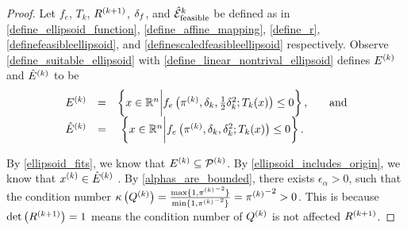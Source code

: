 \begin{proof}
Let 
$f_e$,
$T_k$,
${R^{(k+1)}}$, $\delta_{f}$, and ${{\mathcal {\hat E}_{\text{feasible}}}^k}$
be defined as in
\cref{define_ellipsoid_function},
\cref{define_affine_mapping},
\cref{define_r},
\cref{definefeasibleellipsoid}, and
\cref{definescaledfeasibleellipsoid}
respectively. 
Observe \cref{define_suitable_ellipsoid} with \cref{define_linear_nontrival_ellipsoid} defines  ${E^{(k)}}$ and ${{\hat E}^{(k)}}$ to be
\begin{align*}
\begin{array}{cccc}
{E^{(k)}} &=& \left\{x \in \mathbb R^n \bigg | f_e\left(\pi^{(k)}, \delta_k, \frac 1 2 \delta_k^2; T_k(x)\right) \le 0\right\}, &\quad \textrm{and}  \\
{{\hat E}^{(k)}} &=& \left\{x \in \mathbb R^n \bigg | f_e\left({\pi^{(k)}}, \delta_k, \delta_k^2; T_k(x)\right) \le 0\right\}.&
\end{array}
\end{align*}

By \cref{ellipsoid_fits}, we know that ${E^{(k)}} \subseteq {{\mathcal{P}}^{(k)}}$.
By \cref{ellipsoid_includes_origin}, we know that $x^{(k)} \in {{\hat E}^{(k)}}$ .
By \cref{alphas_are_bounded}, there exists $\epsilon_{\alpha} > 0$, such that the condition number 
${\kappa}\left({Q^{(k)}}\right) = \frac{\max\{1, {\pi^{(k)}}^{-2}\}}{\min\{1, {\pi^{(k)}}^{-2}\}} = {\pi^{(k)}}^{-2} > 0$.
This is because $\det\left({R^{(k+1)}}\right) = 1$ means the condition number of ${Q^{(k)}}$ is not affected ${R^{(k+1)}}$.
\end{proof}




